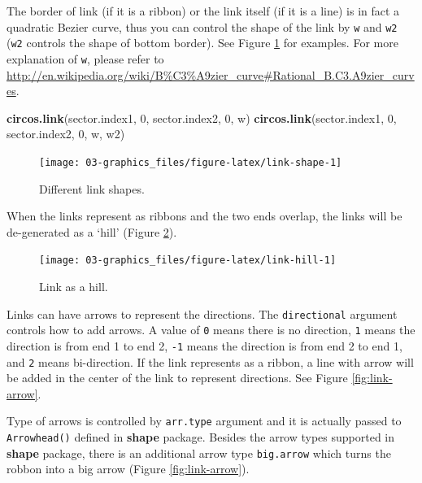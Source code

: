 \documentclass[]{book}
\newenvironment{Shaded}{\begin{snugshade}}{\end{snugshade}}
\newcommand{\KeywordTok}[1]{\textcolor[rgb]{0.13,0.29,0.53}{\textbf{#1}}}
\newcommand{\DecValTok}[1]{\textcolor[rgb]{0.00,0.00,0.81}{#1}}
\newcommand{\NormalTok}[1]{#1}
\begin{document}
The border of link (if it is a ribbon) or the link itself (if it is a
line) is in fact a quadratic Bezier curve, thus you can control the
shape of the link by \texttt{w} and \texttt{w2} (\texttt{w2} controls
the shape of bottom border). See Figure \ref{fig:link-shape} for
examples. For more explanation of \texttt{w}, please refer to
\url{http://en.wikipedia.org/wiki/B\%C3\%A9zier_curve\#Rational_B.C3.A9zier_curves}.

\begin{Shaded}
\begin{Highlighting}[]
\KeywordTok{circos.link}\NormalTok{(sector.index1, }\DecValTok{0}\NormalTok{, sector.index2, }\DecValTok{0}\NormalTok{, w)}
\KeywordTok{circos.link}\NormalTok{(sector.index1, }\DecValTok{0}\NormalTok{, sector.index2, }\DecValTok{0}\NormalTok{, w, w2)}
\end{Highlighting}
\end{Shaded}

\begin{figure}

{\centering \texttt{[image: 03-graphics\_files/figure-latex/link-shape-1]} 

}

\caption{Different link shapes.}\label{fig:link-shape}
\end{figure}

When the links represent as ribbons and the two ends overlap, the links
will be de-generated as a `hill' (Figure \ref{fig:link-hill}).

\begin{figure}

{\centering \texttt{[image: 03-graphics\_files/figure-latex/link-hill-1]} 

}

\caption{Link as a hill.}\label{fig:link-hill}
\end{figure}

Links can have arrows to represent the directions. The
\texttt{directional} argument controls how to add arrows. A value of
\texttt{0} means there is no direction, \texttt{1} means the direction
is from end 1 to end 2, \texttt{-1} means the direction is from end 2 to
end 1, and \texttt{2} means bi-direction. If the link represents as a
ribbon, a line with arrow will be added in the center of the link to
represent directions. See Figure \ref{fig:link-arrow}.

Type of arrows is controlled by \texttt{arr.type} argument and it is
actually passed to \texttt{Arrowhead()} defined in \textbf{shape}
package. Besides the arrow types supported in \textbf{shape} package,
there is an additional arrow type \texttt{big.arrow} which turns the
robbon into a big arrow (Figure \ref{fig:link-arrow}).
\end{document}
